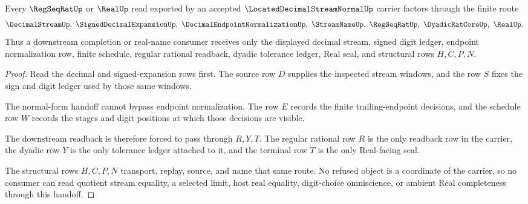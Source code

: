 \begin{theorem}
\label{thm:located-decimal-stream-normal-regseqrat-handoff}
Every $\RegSeqRatUp$ or $\RealUp$ read exported by an accepted $\LocatedDecimalStreamNormalUp$ carrier factors through the finite route
$$
\DecimalStreamUp,\ \SignedDecimalExpansionUp,\ \DecimalEndpointNormalizationUp,\ \StreamNameUp,\ \RegSeqRatUp,\ \DyadicRatCoreUp,\ \RealUp .
$$
Thus a downstream completion or real-name consumer receives only the displayed decimal stream, signed digit ledger, endpoint normalization row, finite schedule, regular rational readback, dyadic tolerance ledger, Real seal, and structural rows $H,C,P,N$.
\end{theorem}
\begin{proof}
Read the decimal and signed-expansion rows first. The source row $D$ supplies the inspected stream windows, and the row $S$ fixes the sign and digit ledger used by those same windows.

The normal-form handoff cannot bypass endpoint normalization. The row $E$ records the finite trailing-endpoint decisions, and the schedule row $W$ records the stages and digit positions at which those decisions are visible.

The downstream readback is therefore forced to pass through $R,Y,T$. The regular rational row $R$ is the only readback row in the carrier, the dyadic row $Y$ is the only tolerance ledger attached to it, and the terminal row $T$ is the only Real-facing seal.

The structural rows $H,C,P,N$ transport, replay, source, and name that same route. No refused object is a coordinate of the carrier, so no consumer can read quotient stream equality, a selected limit, host real equality, digit-choice omniscience, or ambient Real completeness through this handoff.
\end{proof}



